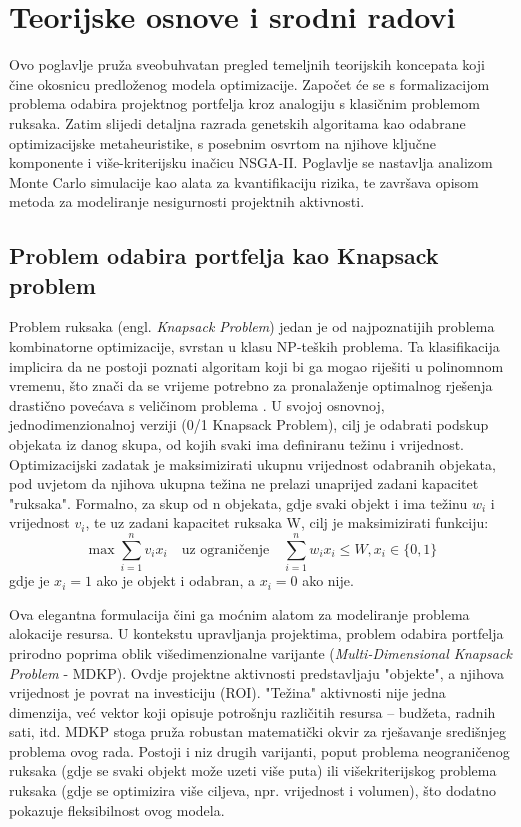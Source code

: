 \section{Teorijske osnove i srodni radovi}
\label{chap:teorija}

Ovo poglavlje pruža sveobuhvatan pregled temeljnih teorijskih koncepata koji čine okosnicu predloženog modela optimizacije. Započet će se s formalizacijom problema odabira projektnog portfelja kroz analogiju s klasičnim problemom ruksaka. Zatim slijedi detaljna razrada genetskih algoritama kao odabrane optimizacijske metaheuristike, s posebnim osvrtom na njihove ključne komponente i više-kriterijsku inačicu NSGA-II. Poglavlje se nastavlja analizom Monte Carlo simulacije kao alata za kvantifikaciju rizika, te završava opisom metoda za modeliranje nesigurnosti projektnih aktivnosti.
\subsection{Problem odabira portfelja kao Knapsack problem}

Problem ruksaka (engl. \textit{Knapsack Problem}) jedan je od najpoznatijih problema kombinatorne optimizacije, svrstan u klasu NP-teških problema. Ta klasifikacija implicira da ne postoji poznati algoritam koji bi ga mogao riješiti u polinomnom vremenu, što znači da se vrijeme potrebno za pronalaženje optimalnog rješenja drastično povećava s veličinom problema \cite{GareyJohnson1979, Kellerer2004}. U svojoj osnovnoj, jednodimenzionalnoj verziji (0/1 Knapsack Problem), cilj je odabrati podskup objekata iz danog skupa, od kojih svaki ima definiranu težinu i vrijednost. Optimizacijski zadatak je maksimizirati ukupnu vrijednost odabranih objekata, pod uvjetom da njihova ukupna težina ne prelazi unaprijed zadani kapacitet "ruksaka". Formalno, za skup od n objekata, gdje svaki objekt i ima težinu $w_i$ i vrijednost $v_i$, te uz zadani kapacitet ruksaka W, cilj je maksimizirati funkciju:
$$
\max \sum_{i=1}^n v_i x_i \quad \text{uz ograničenje} \quad \sum_{i=1}^n w_i x_i \leq W, x_i \in \{0,1\}
$$
gdje je $x_i=1$ ako je objekt i odabran, a $x_i=0$ ako nije.

Ova elegantna formulacija čini ga moćnim alatom za modeliranje problema alokacije resursa. U kontekstu upravljanja projektima, problem odabira portfelja prirodno poprima oblik višedimenzionalne varijante (\textit{Multi-Dimensional Knapsack Problem} - MDKP). Ovdje projektne aktivnosti predstavljaju "objekte", a njihova vrijednost je povrat na investiciju (ROI). "Težina" aktivnosti nije jedna dimenzija, već vektor koji opisuje potrošnju različitih resursa – budžeta, radnih sati, itd. MDKP stoga pruža robustan matematički okvir za rješavanje središnjeg problema ovog rada. Postoji i niz drugih varijanti, poput problema neograničenog ruksaka (gdje se svaki objekt može uzeti više puta) ili višekriterijskog problema ruksaka (gdje se optimizira više ciljeva, npr. vrijednost i volumen), što dodatno pokazuje fleksibilnost ovog modela.

